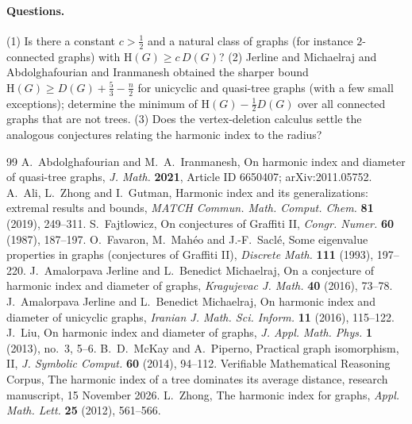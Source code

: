 \documentclass[11pt]{article}
\theoremstyle{definition}
\theoremstyle{remark}
\newcommand{\Hm}{\mathrm{H}}
\newcommand{\D}{D}
\begin{document}
\paragraph{Questions.} (1) Is there a constant $c>\frac12$ and a natural class of graphs (for
instance $2$-connected graphs) with $\Hm(G)\ge c\,\D(G)$? (2) Jerline and Michaelraj
\cite{JM1,JM2} and Abdolghafourian and Iranmanesh \cite{AI} obtained the sharper bound
$\Hm(G)\ge\D(G)+\frac53-\frac n2$ for unicyclic and quasi-tree graphs (with a few small
exceptions); determine the minimum
of $\Hm(G)-\frac12\D(G)$ over all connected graphs that are not trees. (3) Does the
vertex-deletion calculus settle the analogous conjectures relating the harmonic index to the
radius?

\begin{thebibliography}{99}
 A.~Abdolghafourian and M.~A.~Iranmanesh, On harmonic index and diameter of
quasi-tree graphs, \emph{J. Math.} \textbf{2021}, Article ID 6650407; arXiv:2011.05752.
 A.~Ali, L.~Zhong and I.~Gutman, Harmonic index and its generalizations: extremal
results and bounds, \emph{MATCH Commun. Math. Comput. Chem.} \textbf{81} (2019), 249--311.
 S.~Fajtlowicz, On conjectures of Graffiti II, \emph{Congr. Numer.} \textbf{60}
(1987), 187--197.
 O.~Favaron, M.~Mah\'eo and J.-F.~Sacl\'e, Some eigenvalue properties in graphs
(conjectures of Graffiti II), \emph{Discrete Math.} \textbf{111} (1993), 197--220.
 J.~Amalorpava Jerline and L.~Benedict Michaelraj, On a conjecture of harmonic
index and diameter of graphs, \emph{Kragujevac J. Math.} \textbf{40} (2016), 73--78.
 J.~Amalorpava Jerline and L.~Benedict Michaelraj, On harmonic index and diameter
of unicyclic graphs, \emph{Iranian J. Math. Sci. Inform.} \textbf{11} (2016), 115--122.
 J.~Liu, On harmonic index and diameter of graphs, \emph{J. Appl. Math. Phys.}
\textbf{1} (2013), no.~3, 5--6.
 B.~D.~McKay and A.~Piperno, Practical graph isomorphism, II, \emph{J. Symbolic
Comput.} \textbf{60} (2014), 94--112.
 Verifiable Mathematical Reasoning Corpus, The harmonic index of a tree
dominates its average distance, research manuscript, 15 November 2026.
 L.~Zhong, The harmonic index for graphs, \emph{Appl. Math. Lett.} \textbf{25}
(2012), 561--566.
\end{thebibliography}
\end{document}

